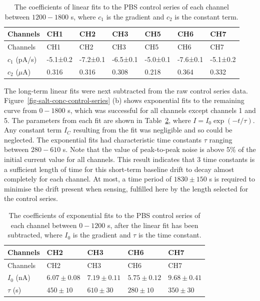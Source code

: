 \documentclass[
  a4paper,
]{scrbook}
\begin{document}
\hypertarget{tbl-linear-fits}{}
\begin{longtable}[]{@{}lllllll@{}}
\caption{\label{tbl-linear-fits}The coefficients of linear fits to the
PBS control series of each channel between \(1200-1800\) s, where
\(c_1\) is the gradient and \(c_2\) is the constant term.\\
}\tabularnewline
\toprule\noalign{}
Channels & CH1 & CH2 & CH3 & CH5 & CH6 & CH7 \\
\midrule\noalign{}
\endfirsthead
\toprule\noalign{}
Channels & CH1 & CH2 & CH3 & CH5 & CH6 & CH7 \\
\midrule\noalign{}
\endhead
\bottomrule\noalign{}
\endlastfoot
\(c_1\) (pA/s) & -5.1±0.2 & -7.2±0.1 & -6.5±0.1 & -5.0±0.1 & -7.6±0.1 &
-5.1±0.2 \\
\(c_2\) (\(\mu\)A) & 0.316 & 0.316 & 0.308 & 0.218 & 0.364 & 0.332 \\
\end{longtable}

The long-term linear fits were next subtracted from the raw control
series data. Figure~\ref{fig-salt-conc-control-series} (b) shows
exponential fits to the remaining curve from \(0 - 1800\) s, which was
successful for all channels except channels 1 and 5. The parameters from
each fit are shown in Table~\ref{tbl-exp-fits}, where
\(I = I_0\exp(-t/\tau)\). Any constant term \(I_C\) resulting from the
fit was negligible and so could be neglected. The exponential fits had
characteristic time constants \(\tau\) ranging between \(280 - 610\) s.
Note that the value of peak-to-peak noise is above 5\% of the initial
current value for all channels. This result indicates that 3 time
constants is a sufficient length of time for this short-term baseline
drift to decay almost completely for each channel. At most, a time
period of \(1830 \pm 150\) s is required to minimise the drift present
when sensing, fulfilled here by the length selected for the control
series.

\hypertarget{tbl-exp-fits}{}
\begin{longtable}[]{@{}lllll@{}}
\caption{\label{tbl-exp-fits}The coefficients of exponential fits to the
PBS control series of each channel between \(0-1200\) s, after the
linear fit has been subtracted, where \(I_0\) is the gradient and
\(\tau\) is the time constant.\\
}\tabularnewline
\toprule\noalign{}
Channels & CH2 & CH3 & CH6 & CH7 \\
\midrule\noalign{}
\endfirsthead
\toprule\noalign{}
Channels & CH2 & CH3 & CH6 & CH7 \\
\midrule\noalign{}
\endhead
\bottomrule\noalign{}
\endlastfoot
\(I_0\) (nA) & \(6.07\pm0.08\) & \(7.19\pm0.11\) & \(5.75\pm0.12\) &
\(9.68\pm0.41\) \\
\(\tau\) (s) & \(450\pm10\) & \(610\pm30\) & \(280\pm10\) &
\(350\pm30\) \\
\end{longtable}
\end{document}
